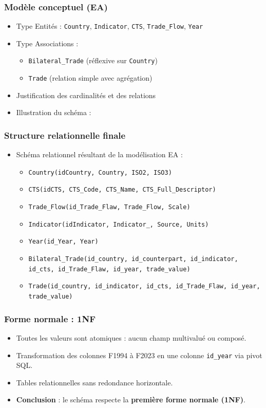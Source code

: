 \documentclass[11pt]{beamer}
\begin{document}
\begin{frame}
  \frametitle{Modèle conceptuel (EA)}
  \begin{itemize}
    \item<1-> Type Entités : \texttt{Country}, \texttt{Indicator}, \texttt{CTS}, \texttt{Trade\_Flow}, \texttt{Year}
    \item<2-> Type Associations : 
      \begin{itemize}
        \item \texttt{Bilateral\_Trade} (réflexive sur \texttt{Country})
        \item \texttt{Trade} (relation simple avec agrégation)
      \end{itemize}
    \item<3-> Justification des cardinalités et des relations
    \item<4-> Illustration du schéma : 
  \end{itemize}
\end{frame}

\begin{frame}
  \frametitle{Structure relationnelle finale}
  \begin{itemize}
    \item Schéma relationnel résultant de la modélisation EA :
    \begin{itemize}
      \item \texttt{Country(idCountry, Country, ISO2, ISO3)}
      \item \texttt{CTS(idCTS, CTS\_Code, CTS\_Name, CTS\_Full\_Descriptor)}
      \item \texttt{Trade\_Flow(id\_Trade\_Flaw, Trade\_Flow, Scale)}
      \item \texttt{Indicator(idIndicator, Indicator\_, Source, Units)}
      \item \texttt{Year(id\_Year, Year)}
      \item \texttt{Bilateral\_Trade(id\_country, id\_counterpart, id\_indicator, id\_cts, id\_Trade\_Flaw, id\_year, trade\_value)}
      \item \texttt{Trade(id\_country, id\_indicator, id\_cts, id\_Trade\_Flaw, id\_year, trade\_value)}
    \end{itemize}
  \end{itemize}
\end{frame}

\begin{frame}
  \frametitle{Forme normale : 1NF}
  \begin{itemize}
    \item Toutes les valeurs sont atomiques : aucun champ multivalué ou composé.
    \item Transformation des colonnes F1994 à F2023 en une colonne \texttt{id\_year} via pivot SQL.
    \item Tables relationnelles sans redondance horizontale.
    \item \textbf{Conclusion} : le schéma respecte la \textbf{première forme normale (1NF)}.
  \end{itemize}
\end{frame}
\end{document}
